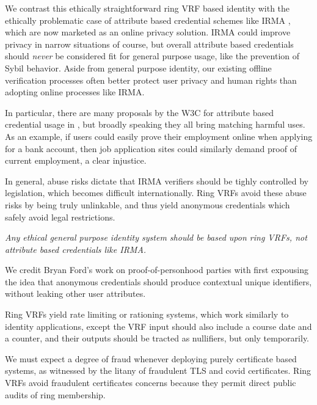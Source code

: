 We contrast this ethically straightforward ring VRF based identity
with the ethically problematic case of attribute based credential
schemes like IRMA \cite{IRMA_credentials},
 which are now marketed as an online privacy solution.
IRMA could improve privacy in narrow situations of course, but
overall attribute based credentials should {\it never} be considered
fit for general purpose usage, like the prevention of Sybil behavior.
Aside from general purpose identity, our existing offline verification
processes often better protect user privacy and human rights than
adopting online processes like IRMA.

In particular, there are many proposals by the W3C for attribute based
credential usage in \cite{w3c_vc_use_cases}, but broadly speaking they
all bring matching harmful uses.  %
As an example, if users could easily prove their employment online when
applying for a bank account, then job application sites could similarly
demand proof of current employment, a clear injustice.

In general, abuse risks dictate that IRMA verifiers should be tighly
controlled by legislation, which becomes difficult internationally. 
%
Ring VRFs avoid these abuse risks by being truly unlinkable, and thus
yield anonymous credentials which safely avoid legal restrictions.

{\it Any ethical general purpose identity system should be based
upon ring VRFs, not attribute based credentials like IRMA.}

We credit Bryan Ford's work on proof-of-personhood parties \cite{pop2008,pop2017}
with first expousing the idea that anonymous credentials should produce
contextual unique identifiers, without leaking other user attributes.


\smallskip

Ring VRFs yield rate limiting or rationing systems, which work
similarly to identity applications, except the VRF input should also
include a course date and a counter, and
 their outputs should be tracted as nullifiers, but only temporarily.

We must expect a degree of fraud whenever deploying purely certificate
based systems, as witnessed by the litany of fraudulent TLS and covid
certificates.  Ring VRFs avoid fraudulent certificates concerns because
they permit direct public audits of ring membership.

